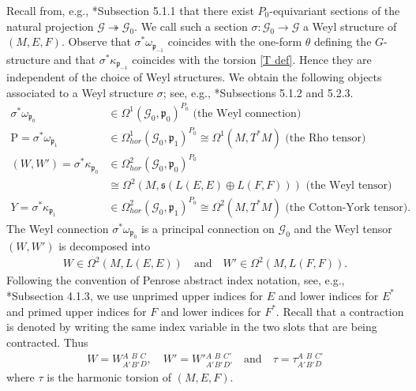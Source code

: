\documentclass[11pt]{amsart}
\begin{document}
Recall from, e.g., \cite{Book}*{Subsection 5.1.1} that there exist $P_0$-equivariant sections of the natural projection $\mathcal G\twoheadrightarrow\mathcal G_0$. We call such a section $\sigma:\mathcal G_0\to\mathcal G$ a Weyl structure of $(M,E,F)$.
Observe that $\sigma^*\omega_{\mathfrak p_{-1}}$ coincides with the one-form $\theta$ defining the $G$-structure and that $\sigma^*\kappa_{\mathfrak p_{-1}}$ coincides with the torsion \eqref{T def}. Hence they are independent of the choice of Weyl structures. 
We obtain the following objects associated to a Weyl structure $\sigma$; see, e.g., \cite{Book}*{Subsections 5.1.2 and 5.2.3}.
\begin{equation}\label{induced Weyl objects}
   \begin{aligned}
\sigma^*\omega_{\mathfrak p_{0}}&\in\Omega^1(\mathcal G_0,\mathfrak p_{0})^{P_0}\text{ (the Weyl connection)}\\
\mathrm P=\sigma^*\omega_{\mathfrak p_{1}}&\in\Omega^1_{hor}(\mathcal G_0,\mathfrak p_{1})^{P_0}\cong \Omega^1(M,T^*M)\text{ (the Rho tensor)}\\
(W,W')=\sigma^*\kappa_{\mathfrak p_{0}}&\in\Omega^2_{hor}(\mathcal G_0,\mathfrak p_{0})^{P_0}\\
&\cong \Omega^2(M,\mathfrak s(L(E,E)\oplus L(F,F)))\text{ (the Weyl tensor)}\\
Y=\sigma^*\kappa_{\mathfrak p_{1}}&\in\Omega^2_{hor}(\mathcal G_0,\mathfrak p_{1})^{P_0}\cong \Omega^2(M,T^*M)\text{ (the Cotton-York tensor)}.
\end{aligned}
\end{equation}
The Weyl connection $\sigma^*\omega_{\mathfrak p_{0}}$ is a principal connection on $\mathcal G_0$ and the Weyl tensor $(W,W')$ is decomposed into
\begin{align*}
    W\in\Omega^2(M,L(E,E))\quad\text{and}\quad W'\in\Omega^2(M,L(F,F)).
\end{align*}
Following the convention of Penrose abstract index notation, see, e.g., \cite{Book}*{Subsection 4.1.3}, we use unprimed upper indices for $E$ and lower indices for $E^*$ and primed upper indices for $F$ and lower indices for $F^*$. Recall that a contraction is denoted by writing the same index variable in the two slots that are being contracted. Thus
\begin{align*}
   W=W{}^A_{A'}{}^B_{B'}{}^{C}_{D},\quad W'=W'{}^A_{A'}{}^B_{B'}{}^{C'}_{D'}\quad\text{and}\quad\tau=\tau{}^A_{A'}{}^B_{B'}{}^{C'}_D
\end{align*}
where $\tau$ is the harmonic torsion of $(M,E,F)$.
\end{document}
